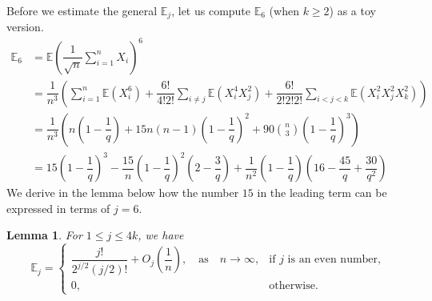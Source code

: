 \documentclass{amsart}
\theoremstyle{plain}
\newtheorem{lemma}[theorem]{Lemma}
\theoremstyle{definition}
\newcommand{\EE}{\mathbb{E}}
\begin{document}
Before we estimate the general $\EE_{j}$, let us compute $\EE_6$ (when $k\geq2$) as a toy version.
\[
\begin{split}
\EE_6
&=\EE\left(\dfrac{1}{\sqrt{n}}\sum_{i=1}^{n}X_i\right)^{6}\\
&=\dfrac1{n^3}\left(\sum_{i=1}^n\EE(X_i^6)+\dfrac{6!}{4!2!}\sum_{i\neq{j}}\EE(X_i^4X_j^2)+\dfrac{6!}{2!2!2!}\sum_{i<j<k}\EE(X_i^2X_j^2X_k^2)\right)\\
&=\dfrac1{n^3}\left(n\left(1-\dfrac1q\right)+15n(n-1)\left(1-\dfrac1q\right)^2+90\binom{n}{3}\left(1-\dfrac1q\right)^3\right)\\
&=15\left(1-\dfrac1q\right)^3-\dfrac{15}{n}\left(1-\dfrac1q\right)^2\left(2-\dfrac3q\right)+\dfrac{1}{n^2}\left(1-\dfrac1q\right)\left(16-\dfrac{45}{q}+\dfrac{30}{q^2}\right)
\end{split}
\]
We derive in the lemma below how the number $15$ in the leading term can be expressed in terms of $j=6$.

\begin{lemma}
\label{lem:higherMoments}
For $1\leq{j}\leq{4k}$, we have
\[
\EE_{j}=
\begin{cases}
\dfrac{j!}{2^{j/2}(j/2)!}+O_j\left(\dfrac1n\right),\quad\text{as}\quad{n}\to\infty,&\mbox{if $j$ is an even number,}\\
0,&\text{otherwise.}
\end{cases}
\]
\end{lemma}
\end{document}
